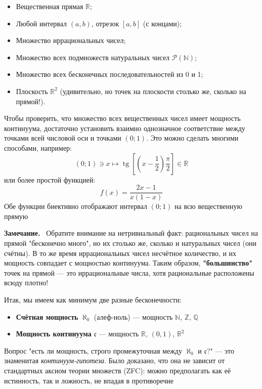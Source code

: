 \documentclass[a4paper,12pt]{article}
\newcommand{\myremark}{\textbf{Замечание.}\ }
\theoremstyle{definition}
\theoremstyle{plain}
\theoremstyle{remark}
\begin{document}
	\begin{tcolorbox}[colback=yellow!5, colframe=orange!60!black, title=Примеры множеств мощности континуума]
		\begin{itemize}
			\item Вещественная прямая $\mathbb{R}$;
			\item Любой интервал $(a, b)$, отрезок $[a, b]$ (с концами);
			\item Множество иррациональных чисел;
			\item Множество всех подмножеств натуральных чисел $\mathcal{P}(\mathbb{N})$;
			\item Множество всех бесконечных последовательностей из 0 и 1;
			\item Плоскость $\mathbb{R}^2$ (удивительно, но точек на плоскости столько же, сколько на прямой!).
		\end{itemize}
	\end{tcolorbox}
	
	\begin{tcolorbox}[colback=blue!5, colframe=blue!40!black, title=Отображение интервала на прямую]
		Чтобы проверить, что множество всех вещественных чисел имеет мощность континуума, достаточно установить взаимно однозначное соответствие между точками всей числовой оси и точками $(0; 1)$. Это можно сделать многими способами, например:
		\[
		(0; 1) \ni x \mapsto \operatorname{tg}\left[\left(x - \frac{1}{2}\right)\frac{\pi}{2}\right] \in \mathbb{R}
		\]
		или более простой функцией:
		\[
		f(x) = \frac{2x-1}{x(1-x)}
		\]
		Обе функции биективно отображают интервал $(0; 1)$ на всю вещественную прямую
	\end{tcolorbox}
	
	\bigskip
	\myremark
	Обратите внимание на нетривиальный факт: рациональных чисел на прямой "бесконечно много", но их столько же, сколько и натуральных чисел (они счётны). В то же время иррациональных чисел несчётное количество, и их мощность совпадает с мощностью континуума. Таким образом, \textbf{"большинство"} точек на прямой — это иррациональные числа, хотя рациональные расположены всюду плотно!
	
	\bigskip
	\begin{tcolorbox}[colback=purple!5, colframe=purple!50!black, title=Заметочка: Иерархия бесконечностей]
		Итак, мы имеем как минимум две разные бесконечности:
		\begin{itemize}
			\item \textbf{Счётная мощность} $\aleph_0$ (алеф-ноль) — мощность $\mathbb{N}$, $\mathbb{Z}$, $\mathbb{Q}$
			\item \textbf{Мощность континуума} $\mathfrak{c}$ — мощность $\mathbb{R}$, $(0,1)$, $\mathbb{R}^2$
		\end{itemize}
		Вопрос "есть ли мощность, строго промежуточная между $\aleph_0$ и $\mathfrak{c}$?" — это знаменитая \textit{континуум-гипотеза}. Было доказано, что она не зависит от стандартных аксиом теории множеств (ZFC): можно предполагать как её истинность, так и ложность, не впадая в противоречие
	\end{tcolorbox}
	
\end{document}
